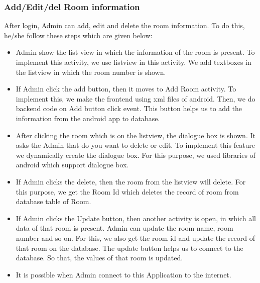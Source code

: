 \subsubsection{Add/Edit/del Room information}
After login, Admin can add, edit and delete the room information. To do this, he/she follow these steps which are given below: 
\begin{itemize}

\item Admin show the list view in which the information of the room is present. To implement this activity, we use listview in this activity. We add textboxes in the listview in which the room number is shown.
\item If Admin click the add button, then it moves to Add Room activity. To implement this, we make the frontend using xml files of android. Then, we do backend code on Add button click event. This button helps us to add the information from the android app to database. 
\item After clicking the room which is on the listview, the dialogue box is shown. It asks the Admin that do you want to delete or edit. To implement this feature we dynamically create the dialogue box. For this purpose, we used libraries of android which support dialogue box. 
\item If Admin clicks the delete, then the room from the listview will delete. For this purpose, we get the Room Id which deletes the record of room from database table of Room. 
\item If Admin clicks the Update button, then another activity is open, in which all data of that room is present. Admin can update the room name, room number and so on. For this, we also get the room id and update the record of that room on the database. The update button helps us to connect to the database. So that, the values of that room is updated.
\item It is possible when Admin connect to this Application to the internet.
\end{itemize}

